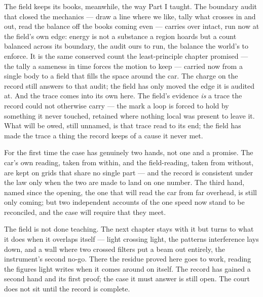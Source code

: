The field keeps its books, meanwhile, the way Part I taught. The boundary audit that closed the mechanics ---
draw a line where we like, tally what crosses in and out, read the balance off the books coming even --- carries
over intact, run now at the field's own edge: energy is not a substance a region hoards but a count balanced
across its boundary, the audit ours to run, the balance the world's to enforce. It is the same conserved count
the least-principle chapter promised --- the tally a sameness in time forces the motion to keep --- carried now
from a single body to a field that fills the space around the car. The charge on the record still answers to
that audit; the field has only moved the edge it is audited at. And the trace comes into its own
here. The field's evidence \emph{is} a trace the record could not otherwise carry --- the mark a loop is forced
to hold by something it never touched, retained where nothing local was present to leave it. What will be owed,
still unnamed, is that trace read to its end; the field has made the trace a thing the record keeps of a cause
it never met.

For the first time the case has genuinely two hands, not one and a promise. The car's own reading, taken from
within, and the field-reading, taken from without, are kept on grids that share no single part --- and the
record is consistent under the law only when the two are made to land on one number. The third hand, named
since the opening, the one that will read the car from far overhead, is still only coming; but two independent
accounts of the one speed now stand to be reconciled, and the case will require that they meet.

The field is not done teaching. The next chapter stays with it but turns to what it does when it overlaps
itself --- light crossing light, the patterns interference lays down, and a wall where two crossed filters put
a beam out entirely, the instrument's second no-go. There the residue proved here goes to work, reading the
figures light writes when it comes around on itself. The record has gained a second hand and its first proof;
the case it must answer is still open. The court does not sit until the record is complete.

